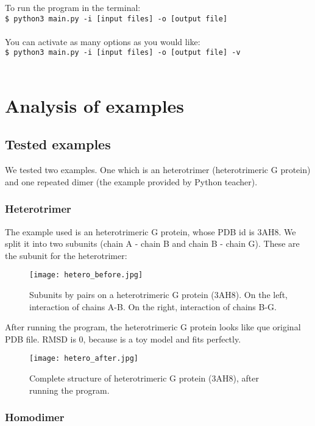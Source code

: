 \documentclass[a4paper,12pt]{report}
\begin{document}
To run the program in the terminal:\\ \texttt{\$ python3 main.py -i [input files] -o [output file]} \\\\ You can activate as many options as you would like:\\ \texttt{\$ python3 main.py -i [input files] -o [output file] -v }\\\\



\chapter{Analysis of examples}

\section{Tested examples}

We tested two %
examples. One which is an heterotrimer (heterotrimeric G protein) and one repeated dimer (the example provided by Python teacher).

\subsection{Heterotrimer}

The example used is an heterotrimeric G protein, whose PDB id is 3AH8. We split it into two subunits (chain A - chain B and chain B - chain G). These are the subunit for the heterotrimer:

\begin{figure}[h]
\centering
\texttt{[image: hetero\_before.jpg]}
\caption{Subunits by pairs on a heterotrimeric G protein (3AH8). On the left, interaction of chains A-B. On the right, interaction of chains B-G.}
\label{fig:1}
\end{figure}

\noindent
After running the program, the heterotrimeric G protein looks like que original PDB file. RMSD is 0, because is a toy model and fits perfectly.

\begin{figure}[h]
\centering
\texttt{[image: hetero\_after.jpg]}
\caption{Complete structure of heterotrimeric G protein (3AH8), after running the program.}
\label{fig:2}
\end{figure}

\subsection{Homodimer}
\end{document}

